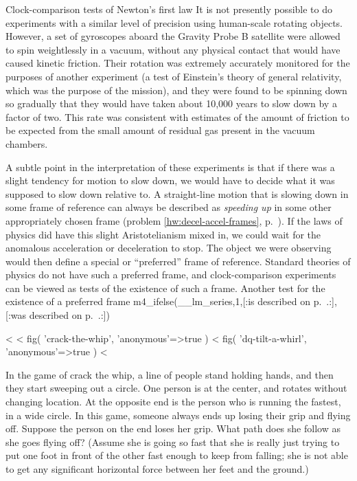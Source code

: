 \begin{eg}{Clock-comparison tests of Newton's first law}
It is not presently possible to do experiments with a similar level of precision using human-scale rotating
objects. However, a set of
gyroscopes aboard the Gravity Probe B satellite were allowed to spin weightlessly in a vacuum, without any
physical contact that would have caused kinetic friction. Their rotation was extremely accurately
monitored for the purposes of another experiment (a test of Einstein's theory of general relativity,
which was the purpose of the mission), and they were found to be spinning down so gradually
that they would have taken about 10,000 years to slow down by a factor of two. This rate was
consistent with estimates of the amount of friction to be expected from the small amount of residual
gas present in the vacuum chambers.

A subtle point in the interpretation of these experiments is that if there was a slight tendency
for motion to slow down, we would have to decide what it was supposed to slow down relative to.
A straight-line motion that is slowing down in some frame of reference can always
be described as \emph{speeding up} in some other appropriately chosen frame (problem \ref{hw:decel-accel-frames},
p.~\pageref{hw:decel-accel-frames}). If the laws of physics did have this slight Aristotelianism
mixed in, we could wait for the anomalous acceleration or deceleration to stop. The object we were
observing would then define a special or ``preferred'' frame of reference. Standard theories of
physics do not have such a preferred frame, and clock-comparison experiments can be viewed as
tests of the existence of such a frame.
Another test for the existence of a 
preferred frame m4_ifelse(__lm_series,1,[:is described on p.~\pageref{sec:battat}.:],[:was described on p.~\pageref{battat}.:])
\end{eg}

\pagebreak[4]

<%
<%
  fig(
    'crack-the-whip',
    {
      'anonymous'=>true
    }
  )
\spacebetweenfigs
<%
  fig(
    'dq-tilt-a-whirl',
    {
      'anonymous'=>true
    }
  )
<%

\startdqs

\begin{dq}\label{dq:crack-the-whip-1}
In the game of crack the whip, a line of people stand
holding hands, and then they start sweeping out a circle.
One person is at the center, and rotates without changing
location.  At the opposite end is the person who is running
the fastest, in a wide circle.  In this game, someone always
ends up losing their grip and flying off.  Suppose the
person on the end loses her grip.  What path does she follow
as she goes flying off?  (Assume she is going so fast that
she is really just trying to put one foot in front of the
other fast enough to keep from falling; she is not able to
get any significant horizontal force between her feet and the ground.)
\end{dq}

